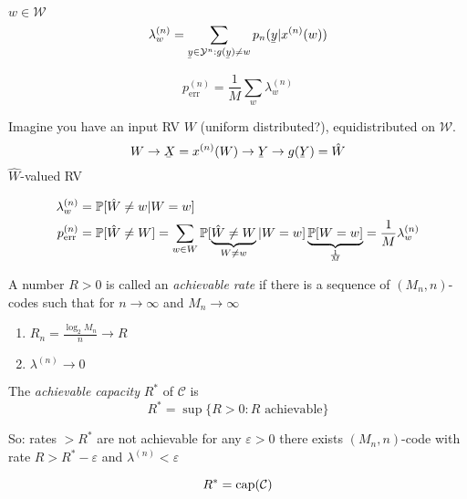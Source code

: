 \documentclass[mfit.tex]{subfiles}
\begin{document}
\begin{defi*}
  $w \in \mathcal{W}$
  \[ \lambda_w^{(n)} = \sum_{\ubar{y} \in \mathcal{Y}^n: g(\ubar{y}) \neq w} p_n(\ubar{y}|x^{(n)}(w)) \]
\end{defi*}

\begin{defi*}
  \[ p_{\text{err}}^{(n)} = \frac{1}{M} \sum_w \lambda_w^{(n)} \]
\end{defi*}

Imagine you have an input RV $W$ (uniform distributed?), equidistributed on $\mathcal{W}$.
\[ W \to \ubar{X} = x^{(n)}(W) \to \ubar{Y} \to g(\ubar{Y}) = \hat{W} \]
$\hat{W}$-valued RV

\begin{align*}
  \lambda_w^{(n)} &= \operatorname{\mathbb{P}}[\hat{W} \neq w| W = w] \\
  p_{\text{err}}^{(n)} &= \operatorname{\mathbb{P}}[\hat{W} \neq W] = \sum_{w \in W} \operatorname{\mathbb{P}}[\underbrace{\hat{W} \neq W}_{W \neq w}| W= w] \underbrace{\operatorname{\mathbb{P}}[W = w]}_{\frac{1}{M}} = \frac{1}{M} \lambda_w^{(n)}
\end{align*}

\begin{defi*}
  A number $R > 0$ is called an \emph{achievable rate} if there is a sequence of $(M_n,n)$-codes such that for $n \to \infty$ and $M_n \to \infty$
  \begin{enumerate}
    \item $R_n = \frac{\log_2 M_n}{n} \to R$
    \item $\lambda^{(n)} \to 0$
  \end{enumerate}
\end{defi*}

\begin{defi*}
  The \emph{achievable capacity} $R^\ast$ of $\mathcal{C}$ is
  \[ R^\ast = \sup\{R>0: R \text{ achievable} \} \]
\end{defi*}

So: rates $> R^\ast$ are not achievable for any $\varepsilon > 0$ there exists $(M_n,n)$-code with rate $R > R^\ast - \varepsilon$ and $\lambda^{(n)} < \varepsilon$

\begin{theorem}
  \[ R^\ast = \operatorname{cap}(\mathcal{C}) \]
\end{theorem}
\end{document}
